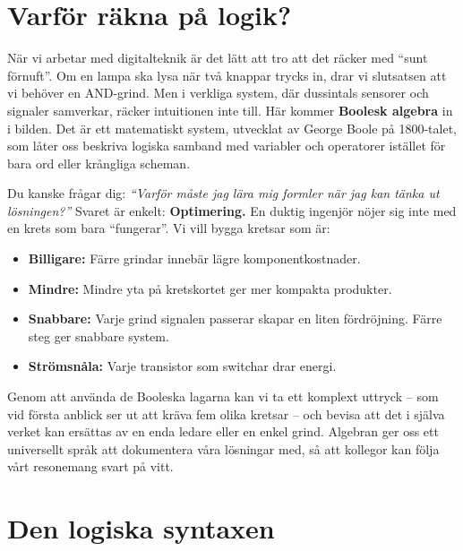 \documentclass[
  swedish,
  letterpaper,
  oneside,
  openany]{book}
\providecommand{\tightlist}{%
  \setlength{\itemsep}{0pt}\setlength{\parskip}{0pt}}
\begin{document}

\section{Varför räkna på logik?}\label{varfuxf6r-ruxe4kna-puxe5-logik}

När vi arbetar med digitalteknik är det lätt att tro att det räcker med
``sunt förnuft''. Om en lampa ska lysa när två knappar trycks in, drar
vi slutsatsen att vi behöver en AND-grind. Men i verkliga system, där
dussintals sensorer och signaler samverkar, räcker intuitionen inte
till. Här kommer \textbf{Boolesk algebra} in i bilden. Det är ett
matematiskt system, utvecklat av George Boole på 1800-talet, som låter
oss beskriva logiska samband med variabler och operatorer istället för
bara ord eller krångliga scheman.

Du kanske frågar dig: \emph{``Varför måste jag lära mig formler när jag
kan tänka ut lösningen?''} Svaret är enkelt: \textbf{Optimering.} En
duktig ingenjör nöjer sig inte med en krets som bara ``fungerar''. Vi
vill bygga kretsar som är:

\begin{itemize}
\tightlist
\item
  \textbf{Billigare:} Färre grindar innebär lägre komponentkostnader.
\item
  \textbf{Mindre:} Mindre yta på kretskortet ger mer kompakta produkter.
\item
  \textbf{Snabbare:} Varje grind signalen passerar skapar en liten
  fördröjning. Färre steg ger snabbare system.
\item
  \textbf{Strömsnåla:} Varje transistor som switchar drar energi.
\end{itemize}

Genom att använda de Booleska lagarna kan vi ta ett komplext uttryck --
som vid första anblick ser ut att kräva fem olika kretsar -- och bevisa
att det i själva verket kan ersättas av en enda ledare eller en enkel
grind. Algebran ger oss ett universellt språk att dokumentera våra
lösningar med, så att kollegor kan följa vårt resonemang svart på vitt.

\section{Den logiska syntaxen}\label{den-logiska-syntaxen}
\end{document}
